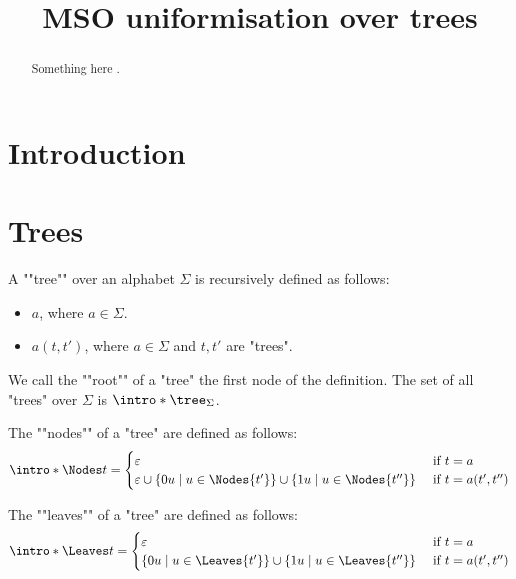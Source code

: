 \documentclass{article}
\begin{document}
\title{MSO uniformisation over trees}

\maketitle

\begin{abstract}
    Something here .
\end{abstract}

\section{Introduction}

\section{Trees}

\begin{definition}[Tree]
	A ""tree"" over an alphabet $\Sigma$ is recursively defined as follows:
	\begin{itemize}
		\item $a$, where $a \in \Sigma$.
		\item $a(t,t')$, where $a \in \Sigma$ and $t, t'$ are "trees".
	\end{itemize}
	We call the ""root"" of a "tree" the first node of the definition.
	The set of all "trees" over $\Sigma$ is $\intro* \tree_{\Sigma}$.
\end{definition}

\begin{definition}[Nodes]
	The ""nodes"" of a "tree" are defined as follows:
	\[
		\intro* \Nodes t =
		\begin{cases}
			\varepsilon                             & \text{ if } t = a         \\
			\varepsilon \cup \setdef {0u} {u \in \Nodes {t'}}
			\cup \setdef {1u} {u \in \Nodes {t''} } & \text{ if } t = a(t',t'')
		\end{cases}
	\]
\end{definition}


\begin{definition}[Leaves]
	The ""leaves"" of a "tree" are defined as follows:
	\[
		\intro* \Leaves t = \begin{cases}
			\varepsilon                              & \text{ if } t = a         \\
			\setdef {0u} {u \in \Leaves {t'}}
			\cup \setdef {1u} {u \in \Leaves {t''} } & \text{ if } t = a(t',t'')
		\end{cases}
	\]
\end{definition}
\end{document}
